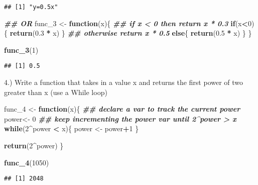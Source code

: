 \documentclass[
]{article}
\newenvironment{Shaded}{\begin{snugshade}}{\end{snugshade}}
\newcommand{\ControlFlowTok}[1]{\textcolor[rgb]{0.13,0.29,0.53}{\textbf{#1}}}
\newcommand{\DecValTok}[1]{\textcolor[rgb]{0.00,0.00,0.81}{#1}}
\newcommand{\DocumentationTok}[1]{\textcolor[rgb]{0.56,0.35,0.01}{\textbf{\textit{#1}}}}
\newcommand{\FloatTok}[1]{\textcolor[rgb]{0.00,0.00,0.81}{#1}}
\newcommand{\FunctionTok}[1]{\textcolor[rgb]{0.13,0.29,0.53}{\textbf{#1}}}
\newcommand{\NormalTok}[1]{#1}
\newcommand{\OtherTok}[1]{\textcolor[rgb]{0.56,0.35,0.01}{#1}}
\newcommand{\SpecialCharTok}[1]{\textcolor[rgb]{0.81,0.36,0.00}{\textbf{#1}}}
\begin{document}
\begin{verbatim}
## [1] "y=0.5x"
\end{verbatim}

\begin{Shaded}
\begin{Highlighting}[]
\DocumentationTok{\#\# OR}
\NormalTok{func\_3 }\OtherTok{\textless{}{-}} \ControlFlowTok{function}\NormalTok{(x)\{}
  \DocumentationTok{\#\# if x \textless{} 0 then return x * 0.3}
  \ControlFlowTok{if}\NormalTok{(x}\SpecialCharTok{\textless{}}\DecValTok{0}\NormalTok{)\{}
    \FunctionTok{return}\NormalTok{(}\FloatTok{0.3} \SpecialCharTok{*}\NormalTok{ x)}
\NormalTok{  \}}
  \DocumentationTok{\#\# otherwise return x * 0.5}
  \ControlFlowTok{else}\NormalTok{\{}
    \FunctionTok{return}\NormalTok{(}\FloatTok{0.5} \SpecialCharTok{*}\NormalTok{ x)}
\NormalTok{  \}}
\NormalTok{\}}

\FunctionTok{func\_3}\NormalTok{(}\DecValTok{1}\NormalTok{)}
\end{Highlighting}
\end{Shaded}

\begin{verbatim}
## [1] 0.5
\end{verbatim}

4.) Write a function that takes in a value x and returns the first power
of two greater than x (use a While loop)

\begin{Shaded}
\begin{Highlighting}[]
\NormalTok{func\_4 }\OtherTok{\textless{}{-}} \ControlFlowTok{function}\NormalTok{(x)\{}
  \DocumentationTok{\#\# declare a var to track the current power}
\NormalTok{  power}\OtherTok{\textless{}{-}} \DecValTok{0}
  \DocumentationTok{\#\# keep incrementing the power var until 2\^{}power \textgreater{} x}
  \ControlFlowTok{while}\NormalTok{(}\DecValTok{2}\SpecialCharTok{\^{}}\NormalTok{power }\SpecialCharTok{\textless{}}\NormalTok{ x)\{}
\NormalTok{    power }\OtherTok{\textless{}{-}}\NormalTok{ power}\SpecialCharTok{+}\DecValTok{1}
\NormalTok{  \}}
  
  \FunctionTok{return}\NormalTok{(}\DecValTok{2}\SpecialCharTok{\^{}}\NormalTok{power)}
\NormalTok{\}}

\FunctionTok{func\_4}\NormalTok{(}\DecValTok{1050}\NormalTok{)}
\end{Highlighting}
\end{Shaded}

\begin{verbatim}
## [1] 2048
\end{verbatim}
\end{document}
